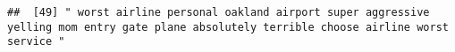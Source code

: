 \documentclass[
]{article}
\begin{document}
\begin{verbatim}
##  [49] " worst airline personal oakland airport super aggressive yelling mom entry gate plane absolutely terrible choose airline worst service "                                                                                                                                                                                                                                                                                                                                                                                                                                                                                                                                                                                                                                                                                                                                                                                                                                                                                                                                                                                                                                                                                                                                                                                                                                                                                                                                                                                                                                                                                                                                                                                                                                                       

\end{verbatim}
\end{document}
